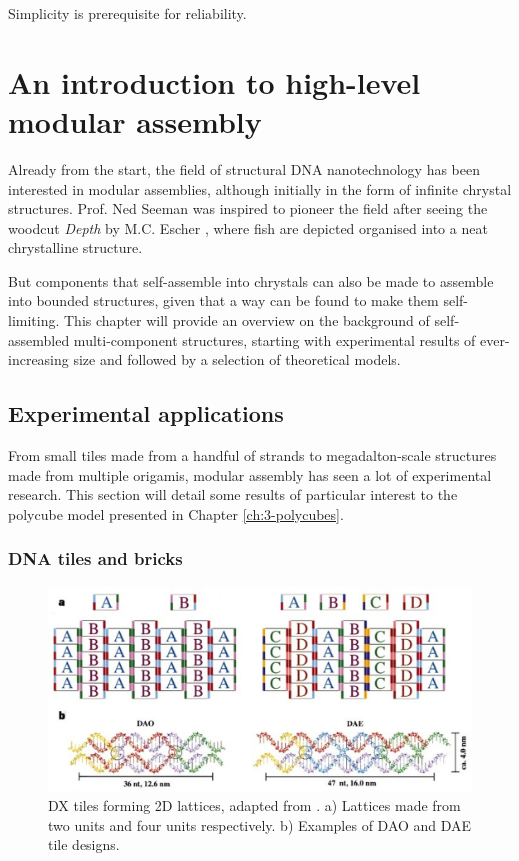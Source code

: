 \begin{savequote}[8cm]
Simplicity is prerequisite for reliability.
\end{savequote}

\chapter{An introduction to high-level modular assembly}

\minitoc

Already from the start, the field of structural DNA nanotechnology has been interested in modular assemblies, although initially in the form of infinite chrystal structures. Prof. Ned Seeman was inspired to pioneer the field after seeing the woodcut \emph{Depth} by M.C. Escher \cite{seeman_2016}, where fish are depicted organised into a neat chrystalline structure.

But components that self-assemble into chrystals can also be made to assemble into bounded structures, given that a way can be found to make them self-limiting. This chapter will provide an overview on the background of self-assembled multi-component structures, starting with experimental results of ever-increasing size and followed by a selection of theoretical models.

\section{Experimental applications} \label{sec:experimental_appl}
From small tiles made from a handful of strands to megadalton-scale structures made from multiple origamis, modular assembly has seen a lot of experimental research. This section will detail some results of particular interest to the polycube model presented in Chapter \ref{ch:3-polycubes}.

\subsection{DNA tiles and bricks}

\begin{figure}[h]
  \centering\includegraphics[width=\textwidth]{figures/dna_tiles.png}
  \caption{DX tiles forming 2D lattices, adapted from \cite{winfree1998design}. a) Lattices made from two units and four units respectively. b) Examples of DAO and DAE tile designs.}
  \label{fig:dna_tiles}
\end{figure}

